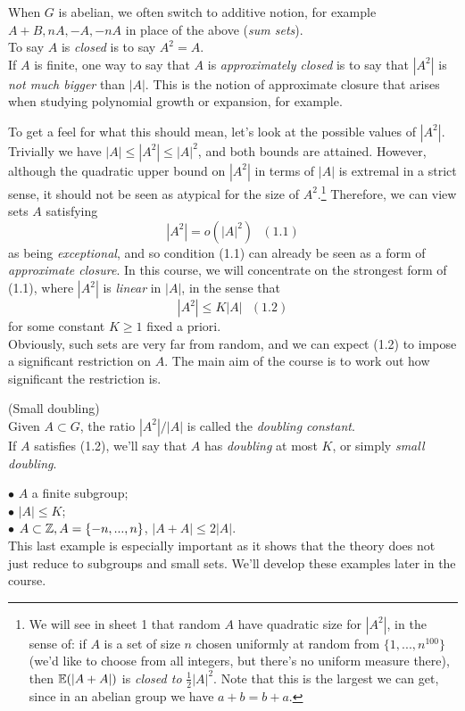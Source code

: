 \documentclass[a4paper]{article}
\begin{document}
When $G$ is abelian, we often switch to additive notion, for example $A+B, nA, -A,-nA$ in place of the above (\emph{sum sets}).\\
To say $A$ is \emph{closed} is to say $A^2 = A$.\\
If $A$ is finite, one way to say that $A$ is \emph{approximately closed} is to say that $|A^2|$ is \emph{not much bigger} than $|A|$. This is the notion of approximate closure that arises when studying polynomial growth or expansion, for example.

To get a feel for what this should mean, let's look at the possible values of $|A^2|$. Trivially we have $|A| \leq |A^2| \leq |A|^2$, and both bounds are attained. However, although the quadratic upper bound on $|A^2|$ in terms of $|A|$ is extremal in a strict sense, it should not be seen as atypical for the size of $A^2$.\footnote{We will see in sheet 1 that random $A$ have quadratic size for $|A^2|$, in the sense of: if $A$ is a set of size $n$ chosen uniformly at random from $\{1,...,n^{100}\}$ (we'd like to choose from all integers, but there's no uniform measure there), then $\mathbb{E}(|A+A|)$ is \emph{closed to} $\frac{1}{2} |A|^2$. Note that this is the largest we can get, since in an abelian group we have $a+b=b+a$.} Therefore, we can view sets $A$ satisfying
$$|A^2| = o(|A|^2)\ \ \ (1.1)$$
as being \emph{exceptional}, and so condition (1.1) can already be seen as a form of \emph{approximate closure}. In this course, we will concentrate on the strongest form of (1.1), where $|A^2|$ is \emph{linear} in $|A|$, in the sense that
$$|A^2| \leq K|A|\ \ \ (1.2)$$
for some constant $K \geq 1$ fixed a priori.\\
Obviously, such sets are very far from random, and we can expect (1.2) to impose a significant restriction on $A$. The main aim of the course is to work out how significant the restriction is.

\begin{defi} (Small doubling)\\
Given $A \subset G$, the ratio $|A^2| / |A|$ is called the \emph{doubling constant}.\\
If $A$ satisfies (1.2), we'll say that $A$ has \emph{doubling} at most $K$, or simply \emph{small doubling}.\\
\end{defi}

\begin{eg}
$\bullet$ $A$ a finite subgroup;\\
$\bullet$ $|A| \leq K$;\\
$\bullet$ $A \subset \mathbb{Z}, A = \{-n,...,n\}$, $|A+A|\leq 2|A|$.\\

This last example is especially important as it shows that the theory does not just reduce to subgroups and small sets. We'll develop these examples later in the course.
\end{eg}
\end{document}
